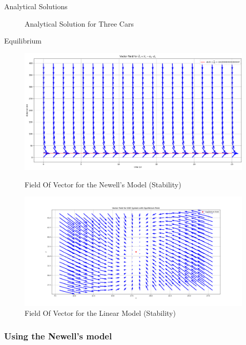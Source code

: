 \documentclass{beamer}
\begin{document}
\begin{frame}{Analytical Solutions}
\begin{figure}[H]
\begin{minipage}[t]{0.49\linewidth}
			\caption{Analytical Solution for Three Cars}
			\label{fig:AnalyticalSolution}
		\end{minipage}\hfill
		\label{fig:CombinedFigures}
	\end{figure}
\end{frame}

\begin{frame}{Equilibrium}
	\begin{figure}[H]
		\centering
		\begin{minipage}[t]{0.59\textwidth}
			\centering
			\includegraphics[width=1\linewidth]{FieldOfVector_CV.png}
			\caption{Field Of Vector for the Newell's Model (Stability)}
		\end{minipage}
		\hfill 
		\begin{minipage}[t]{0.39\textwidth}
			\centering
			\includegraphics[width=0.9\linewidth]{FieldOfVector_CV2.png}
			\caption{Field Of Vector for the Linear Model (Stability)}
			\label{fig:FV1}
		\end{minipage}
		\label{fig:CombinedFigures}
	\end{figure}
\end{frame}



\subsubsection{Using the Newell's model}
\end{document}
